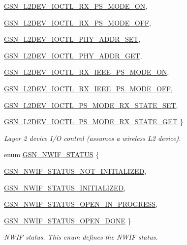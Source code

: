 \begin{DoxyCompactItemize}
\par
\hyperlink{a00670_gga8d699f24bea4c9cf889e2cd1e854d06ea91a8bb3cf452c123d373d10055b3056c}{GSN\_\-L2DEV\_\-IOCTL\_\-RX\_\-PS\_\-MODE\_\-ON}, 
\par
\hyperlink{a00670_gga8d699f24bea4c9cf889e2cd1e854d06eaa8650c6bbf86242e8d10384073894f4d}{GSN\_\-L2DEV\_\-IOCTL\_\-RX\_\-PS\_\-MODE\_\-OFF}, 
\par
\hyperlink{a00670_gga8d699f24bea4c9cf889e2cd1e854d06ea41e5f14dfcdd5084cccdfdcf188c9c12}{GSN\_\-L2DEV\_\-IOCTL\_\-PHY\_\-ADDR\_\-SET}, 
\par
\hyperlink{a00670_gga8d699f24bea4c9cf889e2cd1e854d06ea22b65238a5b76daf10c1c8dfa51374a5}{GSN\_\-L2DEV\_\-IOCTL\_\-PHY\_\-ADDR\_\-GET}, 
\par
\hyperlink{a00670_gga8d699f24bea4c9cf889e2cd1e854d06eaa9cbcab3a1533297188cbb315c2525d3}{GSN\_\-L2DEV\_\-IOCTL\_\-RX\_\-IEEE\_\-PS\_\-MODE\_\-ON}, 
\par
\hyperlink{a00670_gga8d699f24bea4c9cf889e2cd1e854d06eaa7cefeecba35a72029c8318038a52e6f}{GSN\_\-L2DEV\_\-IOCTL\_\-RX\_\-IEEE\_\-PS\_\-MODE\_\-OFF}, 
\par
\hyperlink{a00670_gga8d699f24bea4c9cf889e2cd1e854d06ea9cd933f898f7daf3dc334f75fc9d9577}{GSN\_\-L2DEV\_\-IOCTL\_\-PS\_\-MODE\_\-RX\_\-STATE\_\-SET}, 
\par
\hyperlink{a00670_gga8d699f24bea4c9cf889e2cd1e854d06ea50d8640fbca1d94a5c60aa20034b20c0}{GSN\_\-L2DEV\_\-IOCTL\_\-PS\_\-MODE\_\-RX\_\-STATE\_\-GET}
 \}
\begin{DoxyCompactList}\small\item\em Layer 2 device I/O control (assumes a wireless L2 device). \end{DoxyCompactList}\item 
enum \hyperlink{a00670_ga6831d8e94870e58c8ba6de3fd14e829d}{GSN\_\-NWIF\_\-STATUS} \{ \par
\hyperlink{a00670_gga6831d8e94870e58c8ba6de3fd14e829dab86b0ac682d8405ae1ab5f27193b5f8c}{GSN\_\-NWIF\_\-STATUS\_\-NOT\_\-INITIALIZED}, 
\par
\hyperlink{a00670_gga6831d8e94870e58c8ba6de3fd14e829dab64258dc583468badc6b259d23e29a3b}{GSN\_\-NWIF\_\-STATUS\_\-INITIALIZED}, 
\par
\hyperlink{a00670_gga6831d8e94870e58c8ba6de3fd14e829daf1dad44940ad39f72a1b4e8e32cfc57a}{GSN\_\-NWIF\_\-STATUS\_\-OPEN\_\-IN\_\-PROGRESS}, 
\par
\hyperlink{a00670_gga6831d8e94870e58c8ba6de3fd14e829da00983344dccba515ab60c8b49d08e99a}{GSN\_\-NWIF\_\-STATUS\_\-OPEN\_\-DONE}
 \}
\begin{DoxyCompactList}\small\item\em NWIF status. This enum defines the NWIF status. \end{DoxyCompactList}\item 

\end{DoxyCompactItemize}
